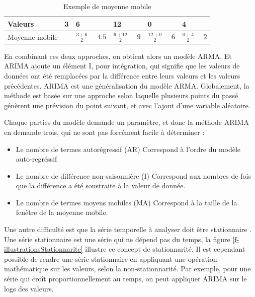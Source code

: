 \documentclass[paper=a4, fontsize=11pt]{scrartcl}
\begin{document}
\begin{table}[H]
\centering
\begin{tabular}{ |m{2cm}|m{2cm}|m{2cm}|m{2cm}|m{2cm}|m{2cm}|  }
    \hline
    Valeurs & 3 & 6 & 12 & 0 & 4 \\
    \hline
    Moyenne mobile & - & $\frac{3+6}{2} = 4.5$ & $\frac{6+12}{2} = 9$ & $\frac{12+0}{2} = 6$ & $\frac{0+4}{2} = 2$ \\
    \hline
\end{tabular}
\caption{Exemple de moyenne mobile}
\label{t-ExempleMoyenneMobile}
\end{table}

En combinant ces deux approches, on obtient alors un modèle ARMA. Et ARIMA ajoute un élément I, pour intégration, qui signifie que les valeurs de données ont été remplacées par la différence entre leurs valeurs et les valeurs précédentes. ARIMA est une généralisation du modèle ARMA. \newline
Globalement, la méthode est basée sur une approche selon laquelle plusieurs points du passé génèrent une prévision du point suivant, et avec l'ajout d'une variable aléatoire.

Chaque parties du modèle demande un paramètre, et donc la méthode ARIMA en demande trois, qui ne sont pas forcément facile à déterminer :
\begin{itemize}
    \item Le nombre de termes autorégressif (AR)
    \subitem Correspond à l'ordre du modèle auto-regréssif \cite{noauthor_processus_2020}
    \item Le nombre de différence non-saisonnière (I)
    \subitem Correspond aux nombres de fois que la différence a été soustraite à la valeur de donnée.
    \item Le nombre de termes moyens mobiles (MA)
    \subitem Correspond à la taille de la fenêtre de la moyenne mobile.
\end{itemize}

Une autre difficulté est que la série temporelle à analyser doit être stationnaire \cite{noauthor_stationnarite_2020}. Une série stationnaire est une série qui ne dépend pas du temps, la figure \ref{f-illustrationsStationnarite} illustre ce concept de stationnarité. Il est cependant possible de rendre une série stationnaire en appliquant une opération mathématique sur les valeurs, selon la non-stationnarité. Par exemple, pour une série qui croît proportionnellement au temps, on peut appliquer ARIMA sur le logs des valeurs.
\end{document}
